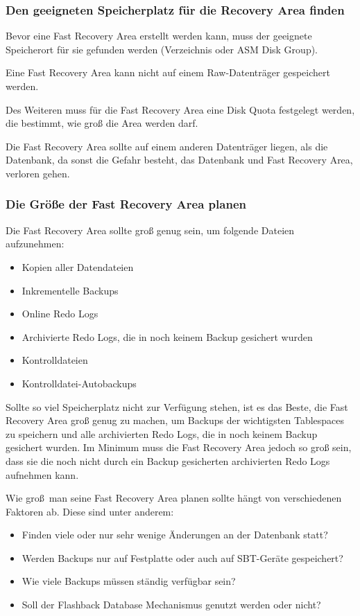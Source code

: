         \subsubsection{Den geeigneten Speicherplatz für die Recovery Area finden}
          Bevor eine Fast Recovery Area erstellt werden kann, muss der geeignete
          Speicherort für sie gefunden werden (Verzeichnis oder ASM Disk
          Group).
          \begin{merke}
            Eine Fast Recovery Area kann nicht auf einem Raw-Datenträger gespeichert werden.
          \end{merke}
          Des Weiteren muss für die Fast Recovery Area eine Disk Quota festgelegt werden, die bestimmt, wie groß die Area werden darf.

          Die Fast Recovery Area sollte auf einem anderen Datenträger liegen, als die Datenbank, da sonst die Gefahr besteht, das Datenbank und Fast Recovery Area, verloren gehen.
        \subsubsection{Die Größe der Fast Recovery Area planen}
          Die Fast Recovery Area sollte groß genug sein, um folgende Dateien aufzunehmen:
          \begin{itemize}
            \item Kopien aller Datendateien
            \item Inkrementelle Backups
            \item Online Redo Logs
            \item Archivierte Redo Logs, die in noch keinem Backup gesichert wurden
            \item Kontrolldateien
            \item Kontrolldatei-Autobackups
          \end{itemize}
          Sollte so viel Speicherplatz nicht zur Verfügung stehen, ist es das Beste, die Fast Recovery Area groß genug zu machen, um Backups der wichtigsten Tablespaces zu speichern und alle archivierten Redo Logs, die in noch keinem Backup gesichert wurden. Im Minimum muss die Fast Recovery Area jedoch so groß sein, dass sie die noch nicht durch ein Backup gesicherten archivierten Redo Logs aufnehmen kann.

          \begin{merke}
            Wie groß\ man seine Fast Recovery Area planen sollte hängt von verschiedenen Faktoren ab. Diese sind unter anderem:
            \begin{itemize}
              \item Finden viele oder nur sehr wenige Änderungen an der Datenbank statt?
              \item Werden Backups nur auf Festplatte oder auch auf SBT-Geräte gespeichert?
              \item Wie viele Backups müssen ständig verfügbar sein?
              \item Soll der Flashback Database Mechanismus genutzt werden oder nicht?
            \end{itemize}
          \end{merke}
